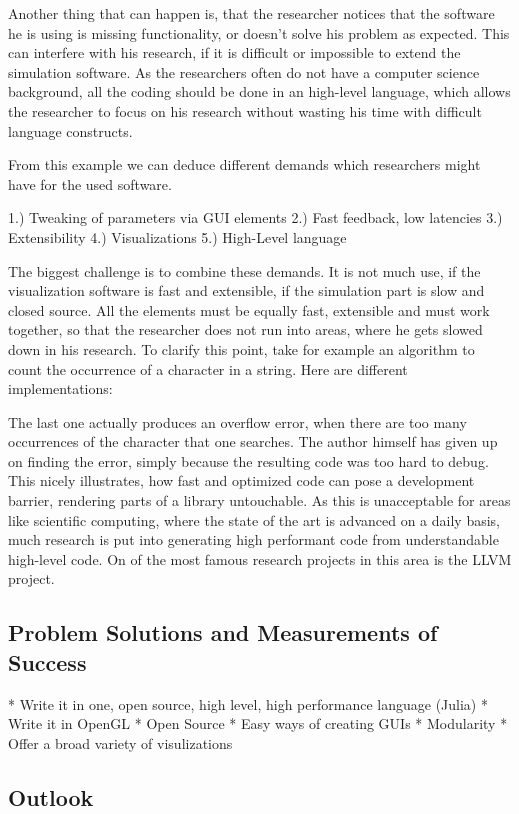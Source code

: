 Another thing that can happen is, that the researcher notices that the software he is using is missing functionality, or doesn't solve his problem as expected. This can interfere with his research, if it is difficult or impossible to extend the simulation software. 
As the researchers often do not have a computer science background, all the coding should be done in an high-level language, which allows the researcher to focus on his research without wasting his time with difficult language constructs.

From this example we can deduce different demands which researchers might have for the used software.

1.) Tweaking of parameters via GUI elements
2.) Fast feedback, low latencies
3.) Extensibility
4.) Visualizations
5.) High-Level language

The biggest challenge is to combine these demands. It is not much use, if the visualization software is fast and extensible, if the simulation part is slow and closed source. All the elements must be equally fast, extensible and must work together, so that the researcher does not run into areas, where he gets slowed down in his research.
To clarify this point, take for example an algorithm to count the occurrence of a character in a string.
Here are different implementations:


The last one actually produces an overflow error, when there are too many occurrences of the character that one searches.
The author himself has given up on finding the error, simply because the resulting code was too hard to debug.
This nicely illustrates, how fast and optimized code can pose a development barrier, rendering parts of a library untouchable.
As this is unacceptable for areas like scientific computing, where the state of the art is advanced on a daily basis, much research is put into generating high performant code from understandable high-level code.
On of the most famous research projects in this area is the LLVM project.



\subsection{Problem Solutions and Measurements of Success}
* Write it in one, open source, high level, high performance language (Julia)
* Write it in OpenGL
* Open Source
* Easy ways of creating GUIs
* Modularity
* Offer a broad variety of visulizations


\subsection{Outlook}

